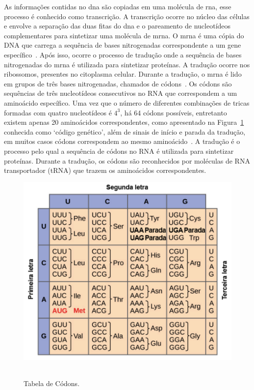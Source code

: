 As informações contidas no \gls{dna} são copiadas em uma molécula de \gls{rna}, esse processo é conhecido como transcrição. A transcrição ocorre no núcleo das células e envolve a separação das duas fitas do \gls{dna} e o pareamento de nucleotídeos complementares para sintetizar uma molécula de \gls{mrna}. O \gls{mrna} é uma cópia do DNA que carrega a sequência de bases nitrogenadas correspondente a um gene específico~\cite{alberts_biologia_2017}.
Após isso, ocorre o processo de tradução onde a sequência de bases nitrogenadas do \gls{mrna} é utilizada para sintetizar proteínas. A tradução ocorre nos ribossomos, presentes no citoplasma celular. Durante a tradução, o \gls{mrna} é lido em grupos de três bases nitrogenadas, chamados de códons~\cite{alberts_biologia_2017}. Os códons são sequências de três nucleotídeos consecutivos no RNA que correspondem a um aminoácido específico. Uma vez que o número de diferentes combinações de tricas formadas com quatro nucleotídeos é $4^3$, há 64 códons possíveis, entretanto existem apenas 20 aminoácidos correspondentes, como apresentado na Figura~\ref{fig:tabelaCodons} conhecida como `código genético', além de sinais de início e parada da tradução, em muitos casos códons correspondem ao mesmo aminoácido~\cite{alberts_biologia_2017}. A tradução é o processo pelo qual a sequência de códons no RNA é utilizada para sintetizar proteínas. Durante a tradução, os códons são reconhecidos por moléculas de RNA transportador (tRNA) que trazem os aminoácidos correspondentes.
\begin{figure}[htb]
  \centering
  \caption{Tabela de Códons.}
  \includegraphics[scale=0.6]{figuras/tabelaCodons.pdf}
  ~\label{fig:tabelaCodons}
\end{figure}


